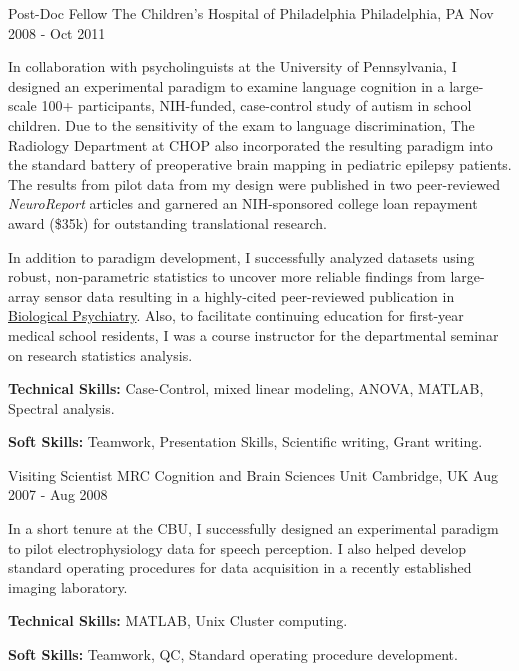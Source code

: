 \begin{cventries}
  \cventry
  {Post-Doc Fellow} %
  {The Children's Hospital of Philadelphia} %
  {Philadelphia, PA} %
  {Nov 2008 - Oct 2011} %
  {
    \begin{cvitems} %
      \item {In collaboration with psycholinguists at the University of Pennsylvania, I designed an experimental paradigm to examine language cognition in a large-scale 100+ participants, NIH-funded, case-control study of autism in school children. Due to the sensitivity of the exam to language discrimination, The Radiology Department at CHOP  also incorporated the resulting paradigm into the standard battery of preoperative brain mapping in pediatric epilepsy patients. The results from pilot data from my design were published in two peer-reviewed \emph{NeuroReport} articles and garnered an NIH-sponsored college loan repayment award (\$35k) for outstanding translational research.}
      \item {In addition to paradigm development, I successfully analyzed datasets using robust, non-parametric statistics to uncover more reliable findings from large-array sensor data resulting in a highly-cited peer-reviewed publication in \href{https://doi.org/10.1016/j.biopsych.2011.01.015}{Biological Psychiatry}. Also, to facilitate continuing education for first-year medical school residents, I was a course instructor for the departmental seminar on research statistics analysis.}
      \item {\textbf{Technical Skills:} Case-Control, mixed linear modeling, ANOVA, MATLAB, Spectral analysis.}
      \item {\textbf{Soft Skills:} Teamwork, Presentation Skills, Scientific writing, Grant writing.}
    \end{cvitems}
  }

  \cventry
  {Visiting Scientist} %
  {MRC Cognition and Brain Sciences Unit} %
  {Cambridge, UK} %
  {Aug 2007 - Aug 2008} %
  {
    \begin{cvitems} %
      \item {In a short tenure at the CBU, I successfully designed an experimental paradigm to pilot electrophysiology data for speech perception. I also helped develop standard operating procedures for data acquisition in a recently established imaging laboratory.}
      \item {\textbf{Technical Skills:} MATLAB, Unix Cluster computing.}
      \item {\textbf{Soft Skills:} Teamwork, QC, Standard operating procedure development.}
    \end{cvitems}
  }

\end{cventries}
